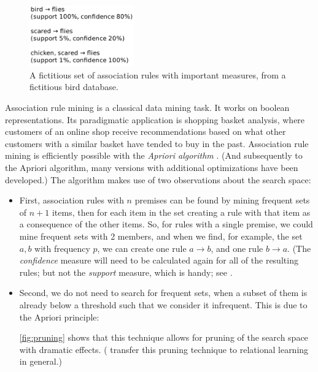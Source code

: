 \label{sec:association-rules}

\begin{figure}[htb]
        \centering
        \includegraphics[width=0.4\textwidth]{images/association-rules.png}
        \caption{A fictitious set of association rules with important measures, from a fictitious bird database.}
        \label{fig:association-rules}
\end{figure}

Association rule mining is a classical data mining task. It works on boolean representations. Its paradigmatic application is shopping basket analysis, where customers of an online shop receive recommendations based on what other customers with a similar basket have tended to buy in the past. Association rule mining is efficiently possible with the \textit{Apriori algorithm} \citep{agrawalFastAlgorithmsMining1994}. (And subsequently to the Apriori algorithm, many versions with additional optimizations have been developed.) The algorithm makes use of two observations about the search space: 

\begin{itemize}
    \item First, association rules with $n$ premises can be found by mining frequent sets of $n + 1$ items, then for each item in the set creating a rule with that item as a consequence of the other items. So, for rules with a single premise, we could mine frequent sets with 2 members, and when we find, for example, the set ${a, b}$ with frequency $p$, we can create one rule $a \rightarrow b$, and one rule $b \rightarrow a$. (The \textit{confidence} measure will need to be calculated again for all of the resulting rules; but not the \textit{support} measure, which is handy; see \citet[p.~350]{tanIntroductionDataMining2014}.
    
    \item Second, we do not need to search for frequent sets, when a subset of them is already below a threshold such that we consider it infrequent. This is due to the Apriori principle:  \citep[p.~333]{tanIntroductionDataMining2014} 
    
    \autoref{fig:pruning} shows that this technique allows for pruning of the search space with dramatic effects. (\citet{deraedtLogicalRelationalLearning2008} transfer this pruning technique to relational learning in general.)
\end{itemize}


